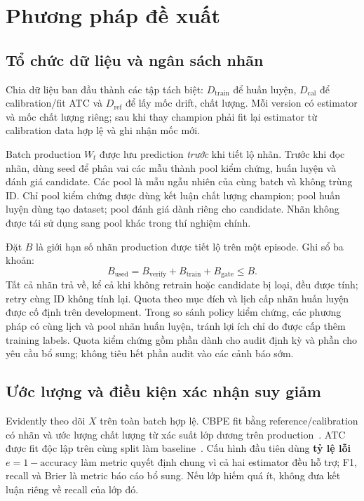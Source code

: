 \section{Phương pháp đề xuất}
\subsection{Tổ chức dữ liệu và ngân sách nhãn}
Chia dữ liệu ban đầu thành các tập tách biệt: $D_{\mathrm{train}}$ để huấn luyện, $D_{\mathrm{cal}}$ để calibration/fit ATC và $D_{\mathrm{ref}}$ để lấy mốc drift, chất lượng. Mỗi version có estimator và mốc chất lượng riêng; sau khi thay champion phải fit lại estimator từ calibration data hợp lệ và ghi nhận mốc mới.

Batch production $W_t$ được lưu prediction \emph{trước} khi tiết lộ nhãn. Trước khi đọc nhãn, dùng seed để phân vai các mẫu thành pool kiểm chứng, huấn luyện và đánh giá candidate. Các pool là mẫu ngẫu nhiên của cùng batch và không trùng ID. Chỉ pool kiểm chứng được dùng kết luận chất lượng champion; pool huấn luyện dùng tạo dataset; pool đánh giá dành riêng cho candidate. Nhãn không được tái sử dụng sang pool khác trong thí nghiệm chính.

Đặt $B$ là giới hạn số nhãn production được tiết lộ trên một episode. Ghi sổ ba khoản:
\[
B_{\mathrm{used}}=B_{\mathrm{verify}}+B_{\mathrm{train}}+B_{\mathrm{gate}}\le B.
\]
Tất cả nhãn trả về, kể cả khi không retrain hoặc candidate bị loại, đều được tính; retry cùng ID không tính lại. Quota theo mục đích và lịch cấp nhãn huấn luyện được cố định trên development. Trong so sánh policy kiểm chứng, các phương pháp có cùng lịch và pool nhãn huấn luyện, tránh lợi ích chỉ do được cấp thêm training labels. Quota kiểm chứng gồm phần dành cho audit định kỳ và phần cho yêu cầu bổ sung; không tiêu hết phần audit vào các cảnh báo sớm.

\subsection{Ước lượng và điều kiện xác nhận suy giảm}
Evidently theo dõi $X$ trên toàn batch hợp lệ. CBPE fit bằng reference/calibration có nhãn và ước lượng chất lượng từ xác suất lớp dương trên production~\cite{cbpe}. ATC được fit độc lập trên cùng split làm baseline~\cite{atc}. Cấu hình đầu tiên dùng \textbf{tỷ lệ lỗi $e=1-\mathrm{accuracy}$} làm metric quyết định chung vì cả hai estimator đều hỗ trợ; F1, recall và Brier là metric báo cáo bổ sung. Nếu lớp hiếm quá ít, không đưa kết luận riêng về recall của lớp đó.

